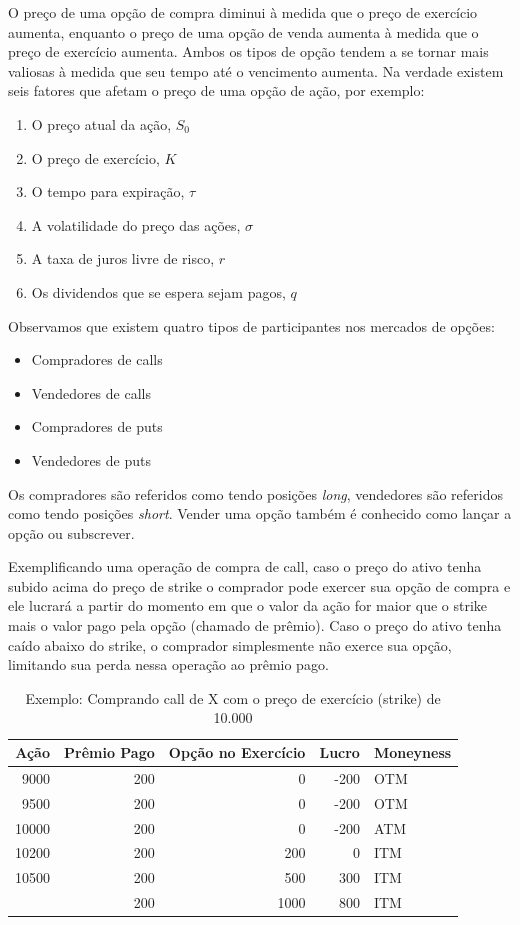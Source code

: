 \documentclass[]{book}
\providecommand{\tightlist}{%
  \setlength{\itemsep}{0pt}\setlength{\parskip}{0pt}}
\begin{document}
O preço de uma opção de compra diminui à medida que o preço de exercício
aumenta, enquanto o preço de uma opção de venda aumenta à medida que o
preço de exercício aumenta. Ambos os tipos de opção tendem a se tornar
mais valiosas à medida que seu tempo até o vencimento aumenta. Na
verdade existem seis fatores que afetam o preço de uma opção de ação,
por exemplo:

\begin{enumerate}
\def\labelenumi{\arabic{enumi}.}
\tightlist
\item
  O preço atual da ação, \(S_0\)
\item
  O preço de exercício, \(K\)
\item
  O tempo para expiração, \(\tau\)
\item
  A volatilidade do preço das ações, \(\sigma\)
\item
  A taxa de juros livre de risco, \(r\)
\item
  Os dividendos que se espera sejam pagos, \(q\)
\end{enumerate}

Observamos que existem quatro tipos de participantes nos mercados de
opções:

\begin{itemize}
\tightlist
\item
  Compradores de calls
\item
  Vendedores de calls
\item
  Compradores de puts
\item
  Vendedores de puts
\end{itemize}

Os compradores são referidos como tendo posições \emph{long}, vendedores
são referidos como tendo posições \emph{short}. Vender uma opção também
é conhecido como lançar a opção ou subscrever.

Exemplificando uma operação de compra de call, caso o preço do ativo
tenha subido acima do preço de strike o comprador pode exercer sua opção
de compra e ele lucrará a partir do momento em que o valor da ação for
maior que o strike mais o valor pago pela opção (chamado de prêmio).
Caso o preço do ativo tenha caído abaixo do strike, o comprador
simplesmente não exerce sua opção, limitando sua perda nessa operação ao
prêmio pago.

\begin{table}[t]

\caption{\label{tab:opcao}Exemplo: Comprando call de X com o preço de exercício (strike) de 10.000}
\centering
\begin{tabular}{rrrrl}
\toprule
Ação & Prêmio Pago & Opção no Exercício & Lucro & Moneyness\\
\midrule
9000 & 200 & 0 & -200 & OTM\\
9500 & 200 & 0 & -200 & OTM\\
10000 & 200 & 0 & -200 & ATM\\
10200 & 200 & 200 & 0 & ITM\\
10500 & 200 & 500 & 300 & ITM\\
\addlinespace
11000 & 200 & 1000 & 800 & ITM\\
\bottomrule
\end{tabular}
\end{table}
\end{document}
